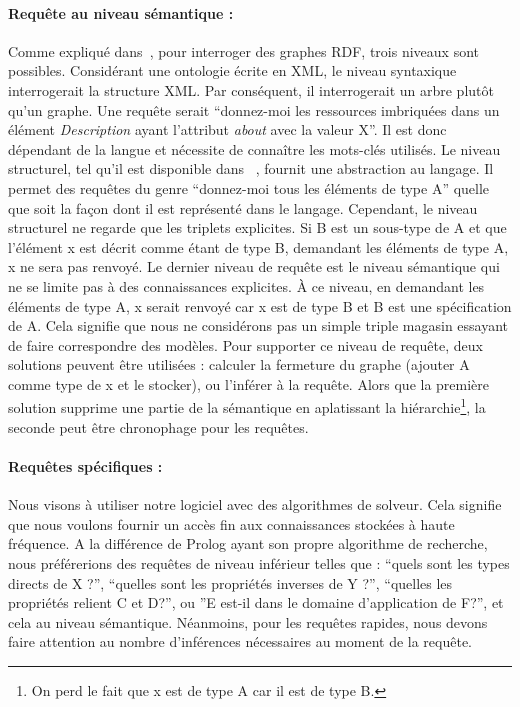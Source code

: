 \paragraph{Requête au niveau sémantique :} Comme expliqué dans~\cite{broekstra_2002_sesame}, pour interroger des graphes RDF, trois niveaux sont possibles. Considérant une ontologie écrite en XML, le niveau syntaxique interrogerait la structure XML. Par conséquent, il interrogerait un arbre plutôt qu'un graphe. Une requête serait ``donnez-moi les ressources imbriquées dans un élément \textit{Description} ayant l'attribut \textit{about} avec la valeur X''. Il est donc dépendant de la langue et nécessite de connaître les mots-clés utilisés. Le niveau structurel, tel qu'il est disponible dans ~\cite{lassila_1998_resource}, fournit une abstraction au langage. Il permet des requêtes du genre ``donnez-moi tous les éléments de type A'' quelle que soit la façon dont il est représenté dans le langage. Cependant, le niveau structurel ne regarde que les triplets explicites. Si B est un sous-type de A et que l'élément x est décrit comme étant de type B, demandant les éléments de type A, x ne sera pas renvoyé. Le dernier niveau de requête est le niveau sémantique qui ne se limite pas à des connaissances explicites. À ce niveau, en demandant les éléments de type A, x serait renvoyé car x est de type B et B est une spécification de A. Cela signifie que nous ne considérons pas un simple triple magasin essayant de faire correspondre des modèles. Pour supporter ce niveau de requête, deux solutions peuvent être utilisées : calculer la fermeture du graphe (ajouter A comme type de x et le stocker), ou l'inférer à la requête. Alors que la première solution supprime une partie de la sémantique en aplatissant la hiérarchie\footnote{On perd le fait que x est de type A car il est de type B.}, la seconde peut être chronophage pour les requêtes.

\paragraph{Requêtes spécifiques :} Nous visons à utiliser notre logiciel avec des algorithmes de solveur. Cela signifie que nous voulons fournir un accès fin aux connaissances stockées à haute fréquence. A la différence de Prolog ayant son propre algorithme de recherche, nous préférerions des requêtes de niveau inférieur telles que : ``quels sont les types directs de X ?'', ``quelles sont les propriétés inverses de Y ?'', ``quelles les propriétés relient C et D?'', ou ''E est-il dans le domaine d'application de F?'', et cela au niveau sémantique. Néanmoins, pour les requêtes rapides, nous devons faire attention au nombre d'inférences nécessaires au moment de la requête.

